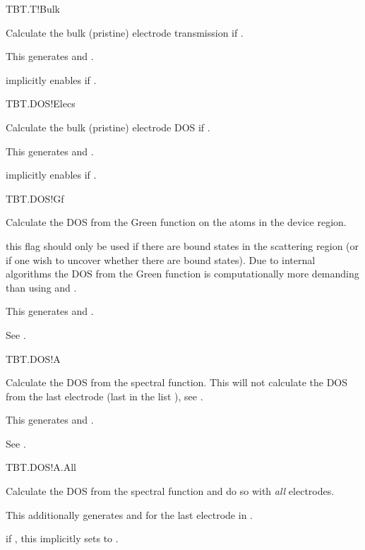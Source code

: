 \begin{fdflogicalF}{TBT.T!Bulk}

  Calculate the bulk (pristine) electrode transmission if
  \fdftrue.

  This generates  and .
  
  \note implicitly enables  if \fdftrue.

\end{fdflogicalF}

\begin{fdflogicalF}{TBT.DOS!Elecs}

  Calculate the bulk (pristine) electrode DOS if
  \fdftrue. 

  This generates  and .

  \note implicitly enables  if \fdftrue.

\end{fdflogicalF}


\begin{fdflogicalF}{TBT.DOS!Gf}

  Calculate the DOS from the Green function on the atoms in the device
  region. 

  \note this flag should only be used if there are bound states in the
  scattering region (or if one wish to uncover whether there are bound
  states). Due to internal algorithms the DOS from the Green function
  is computationally more demanding than using  and
  .

  This generates  and .

  See .

\end{fdflogicalF}

\begin{fdflogicalF}{TBT.DOS!A}

  Calculate the DOS from the spectral function. This will not
  calculate the DOS from the last electrode (last in the list
  ), see . 

  This generates  and .

  See .

\end{fdflogicalF}

\begin{fdflogicalF}{TBT.DOS!A.All}

  Calculate the DOS from the spectral function and do so with
  \emph{all} electrodes.

  This additionally generates  and
   for the last electrode in .

  \note if \fdftrue, this implicitly sets  to \fdftrue.

\end{fdflogicalF}

